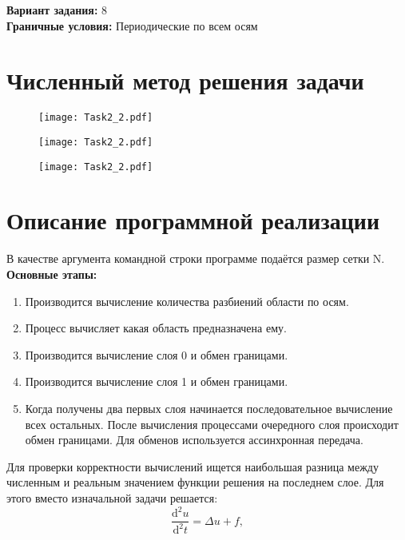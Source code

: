 \documentclass[12pt]{article}
\begin{document}
	\noindent
	\textbf{Вариант задания:} 8 \\
	\textbf{Граничные условия:} Периодические по всем осям \\
	
	\newpage
	\section{Численный метод решения задачи}
	
	\begin{figure}[htbp]
		\centering
		\texttt{[image: Task2\_2.pdf]}
	\end{figure}
	\begin{figure}[htbp]
		\centering
		\texttt{[image: Task2\_2.pdf]}
	\end{figure}
	\begin{figure}[htbp]
		\centering
		\texttt{[image: Task2\_2.pdf]}
	\end{figure}
	
	\section{Описание программной реализации}
	В качестве аргумента командной строки программе подаётся размер сетки N. \\
	
	\newpage
	\textbf{Основные этапы:}
	\begin{enumerate}
		\item Производится вычисление количества разбиений области по осям.
		\item Процесс вычисляет какая область предназначена ему.
		\item Производится вычисление слоя 0 и обмен границами.
		\item Производится вычисление слоя 1 и обмен границами.
		\item Когда получены два первых слоя начинается последовательное вычисление всех остальных. После вычисления процессами очередного слоя происходит обмен границами. Для обменов используется ассинхронная передача. 
	\end{enumerate}

	Для проверки корректности вычислений ищется наибольшая разница между численным и реальным значением функции решения на последнем слое. Для этого вместо изначальной задачи решается:
	$$\frac{\mathrm d^2 u}{\mathrm d^2 t} = \Delta u + f,$$
	
\end{document}
